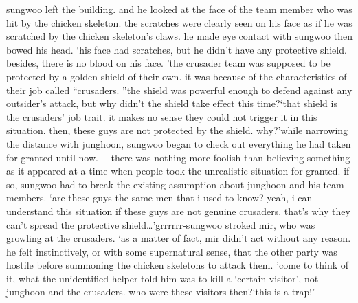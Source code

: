 sungwoo left the building.
 and he looked at the face of the team member who was hit by the chicken skeleton.
the scratches were clearly seen on his face as if he was scratched by the chicken skeleton’s claws.
 he made eye contact with sungwoo then bowed his head.
‘his face had scratches, but he didn’t have any protective shield.
 besides, there is no blood on his face.
’the crusader team was supposed to be protected by a golden shield of their own.
 it was because of the characteristics of their job called “crusaders.
”the shield was powerful enough to defend against any outsider’s attack, but why didn’t the shield take effect this time?‘that shield is the crusaders’ job trait.
 it makes no sense they could not trigger it in this situation.
 then, these guys are not protected by the shield.
 why?’while narrowing the distance with junghoon, sungwoo began to check out everything he had taken for granted until now.
  there was nothing more foolish than believing something as it appeared at a time when people took the unrealistic situation for granted.
if so, sungwoo had to break the existing assumption about junghoon and his team members.
‘are these guys the same men that i used to know? yeah, i can understand this situation if these guys are not genuine crusaders.
 that’s why they can’t spread the protective shield…’grrrrrr-sungwoo stroked mir, who was growling at the crusaders.
‘as a matter of fact, mir didn’t act without any reason.
 he felt instinctively, or with some supernatural sense, that the other party was hostile before summoning the chicken skeletons to attack them.
’come to think of it, what the unidentified helper told him was to kill a ‘certain visitor’, not junghoon and the crusaders.
who were these visitors then?‘this is a trap!’

 